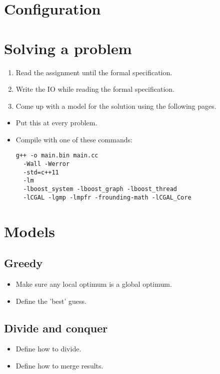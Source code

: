 \documentclass[guide.tex]{subfiles}
\begin{document}
\section{Configuration}



\section{Solving a problem}

{\Huge

\begin{enumerate}
  \item Read the assignment until the formal specification.
  \item Write the IO while reading the formal specification.
  \item Come up with a model for the solution using the following pages.
\end{enumerate}

}

\begin{itemize}
\item Put this at every problem.
  \newline {}
\item Compile with one of these commands:
  \newline {}
  \begin{verbatim}
g++ -o main.bin main.cc
  -Wall -Werror
  -std=c++11
  -lm
  -lboost_system -lboost_graph -lboost_thread
  -lCGAL -lgmp -lmpfr -frounding-math -lCGAL_Core
  \end{verbatim}
\end{itemize}
\pagebreak

\section{Models}
\subsection{Greedy}
\begin{itemize}
  \item Make sure any local optimum is a global optimum.
  \item Define the 'best' guess.
\end{itemize}

\subsection{Divide and conquer}
\begin{itemize}
  \item Define how to divide.
  \item Define how to merge results.
\end{itemize}
\end{document}
